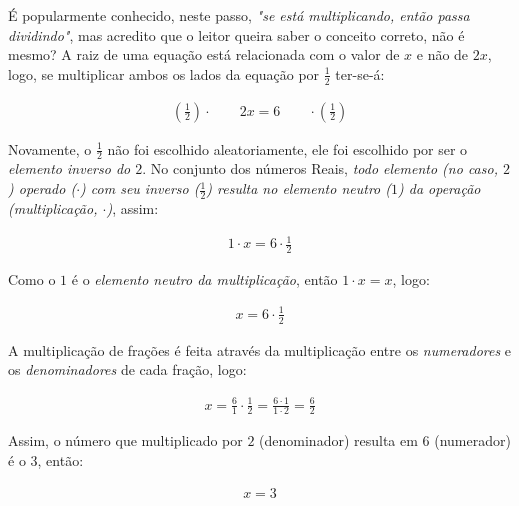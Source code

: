 \begin{example}
É popularmente conhecido, neste passo, \textit{"se está multiplicando, então passa dividindo"}, mas acredito que o leitor queira saber o conceito correto, não é mesmo?
A raiz de uma equação está relacionada com o valor de $x$ e não de $2x$, logo, se multiplicar ambos os lados da equação por $\frac{1}{2}$ ter-se-á:

\begin{ceqn}
	\begin{align*}
	\left(\frac{1}{2} \right) \cdot \qquad 2x=6 \qquad \cdot \left(\frac{1}{2} \right)
	\end{align*}
\end{ceqn}

Novamente, o $\frac{1}{2}$ não foi escolhido aleatoriamente, ele foi escolhido por ser o \textit{elemento inverso do $2$}. No conjunto dos números Reais, \textit{todo elemento (no caso, $2$) operado ($\cdot$) com seu inverso ($\frac{1}{2}$) resulta no elemento neutro ($1$) da operação (multiplicação, $\cdot$)}, assim:

\begin{ceqn}
	\begin{align*}
	1 \cdot x = 6 \cdot \frac{1}{2}
	\end{align*}
\end{ceqn}

Como o $1$ é o \textit{elemento neutro da multiplicação}, então $1 \cdot x = x$, logo:

\begin{ceqn}
	\begin{align*}
	x=6 \cdot \frac{1}{2}
	\end{align*}
\end{ceqn}

A multiplicação de frações é feita através da multiplicação entre os \textit{numeradores} e os \textit{denominadores} de cada fração, logo:

\begin{ceqn}
	\begin{align*}
	x = \frac{6}{1} \cdot \frac{1}{2} = \frac{6 \cdot 1}{1 \cdot 2} = \frac{6}{2}
	\end{align*}
\end{ceqn}

Assim, o número que multiplicado por $2$ (denominador) resulta em $6$ (numerador) é o $3$, então:

\begin{ceqn}
	\begin{align*}
	x = 3
	\end{align*}
\end{ceqn}


\end{example}
